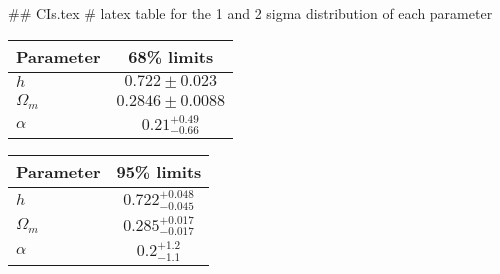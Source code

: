 ## CIs.tex
# latex table for the 1 and 2 sigma distribution of each parameter

\begin{tabular} { l  c}
 Parameter &  68\% limits\\
\hline
{\boldmath$h              $} & $0.722\pm 0.023            $\\
{\boldmath$\Omega_m       $} & $0.2846\pm 0.0088          $\\
{\boldmath$\alpha         $} & $0.21^{+0.49}_{-0.66}      $\\
\hline
\end{tabular}

\begin{tabular} { l  c}
 Parameter &  95\% limits\\
\hline
{\boldmath$h              $} & $0.722^{+0.048}_{-0.045}   $\\
{\boldmath$\Omega_m       $} & $0.285^{+0.017}_{-0.017}   $\\
{\boldmath$\alpha         $} & $0.2^{+1.2}_{-1.1}         $\\
\hline
\end{tabular}
